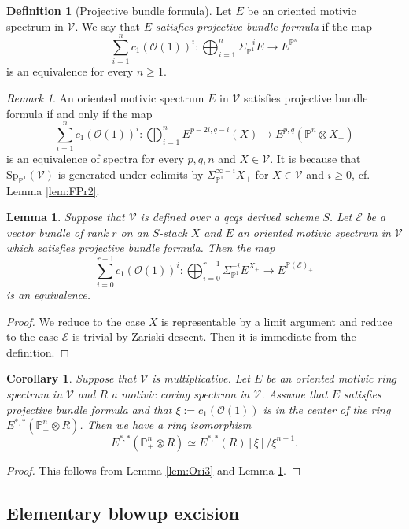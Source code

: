 \documentclass{amsart}
\theoremstyle{plain}
\newtheorem{lemma}[theorem]{Lemma}
\newtheorem{corollary}[theorem]{Corollary}
\theoremstyle{definition}
\newtheorem{definition}[theorem]{Definition}
\theoremstyle{remark}
\newtheorem{remark}[theorem]{Remark}
\numberwithin{equation}{theorem}
\newcommand{\mcal}[1]{\mathcal{#1}}
\newcommand{\mbb}[1]{\mathbb{#1}}
\newcommand{\V}{\mathcal{V}}
\newcommand{\SigmaP}{\Sigma_{\mathbb{P}^1}}
\newcommand{\SpP}{\mathrm{Sp}_{\mathbb{P}^1}}
\begin{document}
\begin{definition}[Projective bundle formula]\label{def:PBF}
Let $E$ be an oriented motivic spectrum in $\V$.
We say that $E$ \textit{satisfies projective bundle formula} if the map
\[
	\sum_{i=1}^nc_1(\mcal{O}(1))^i \colon \bigoplus_{i=1}^n\SigmaP^{-i}E \to E^{\mbb{P}^n}
\]
is an equivalence for every $n\ge 1$.
\end{definition}

\begin{remark}
An oriented motivic spectrum $E$ in $\V$ satisfies projective bundle formula if and only if the map
\[
	\sum_{i=1}^nc_1(\mcal{O}(1))^i \colon \bigoplus_{i=1}^nE^{p-2i,q-i}(X) \to E^{p,q}(\mbb{P}^n\otimes X_+)
\]
is an equivalence of spectra for every $p,q,n$ and $X\in\V$.
It is because that $\SpP(\V)$ is generated under colimits by $\SigmaP^{\infty-i}X_+$ for $X\in\V$ and $i\ge 0$, cf. Lemma \ref{lem:FPr2}.
\end{remark}

\begin{lemma}\label{lem:PBF}
Suppose that $\V$ is defined over a qcqs derived scheme $S$.
Let $\mcal{E}$ be a vector bundle of rank $r$ on an $S$-stack $X$ and $E$ an oriented motivic spectrum in $\V$ which satisfies projective bundle formula.
Then the map
\[
	\sum_{i=0}^{r-1}c_1(\mcal{O}(1))^i \colon \bigoplus_{i=0}^{r-1}\SigmaP^{-i}E^{X_+} \to E^{\mbb{P}(\mcal{E})_+}
\]
is an equivalence.
\end{lemma}
\begin{proof}
We reduce to the case $X$ is representable by a limit argument and reduce to the case $\mcal{E}$ is trivial by Zariski descent.
Then it is immediate from the definition.
\end{proof}

\begin{corollary}\label{cor:PBF}
Suppose that $\V$ is multiplicative.
Let $E$ be an oriented motivic ring spectrum in $\V$ and $R$ a motivic coring spectrum in $\V$.
Assume that $E$ satisfies projective bundle formula and that $\xi:=c_1(\mcal{O}(1))$ is in the center of the ring $E^{*,*}(\mbb{P}^n_+\otimes R)$.
Then we have a ring isomorphism
\[
	E^{*,*}(\mbb{P}^n_+\otimes R) \simeq E^{*,*}(R)[\xi]/\xi^{n+1}.
\]
\end{corollary}
\begin{proof}
This follows from Lemma \ref{lem:Ori3} and Lemma \ref{lem:PBF}.
\end{proof}


\subsection{Elementary blowup excision}\label{EBE}
\end{document}

